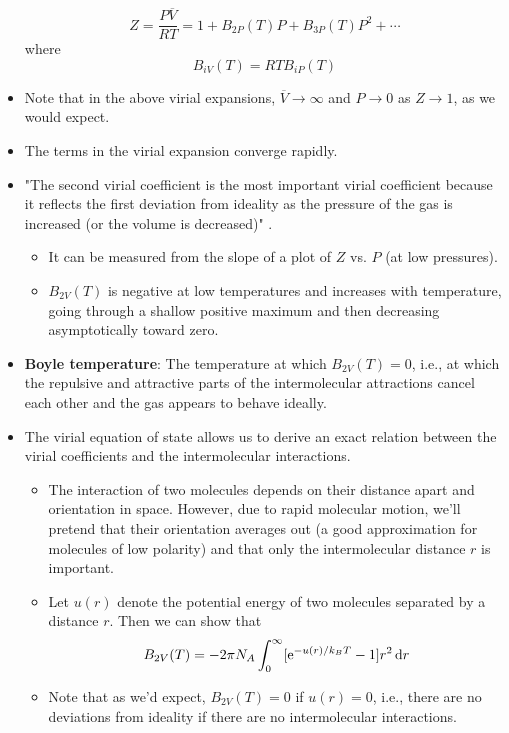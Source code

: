 \documentclass[../notes.tex]{subfiles}
\begin{document}
\begin{itemize}
\begin{equation*}
        Z = \frac{P\overline{V}}{RT}
        = 1+B_{2P}(T)P+B_{3P}(T)P^2+\cdots
    \end{equation*}
    where
    \begin{equation*}
        B_{iV}(T) = RTB_{iP}(T)
    \end{equation*}
    \item Note that in the above virial expansions, $\overline{V}\to\infty$ and $P\to 0$ as $Z\to 1$, as we would expect.
    \item The terms in the virial expansion converge rapidly.
    \item "The second virial coefficient is the most important virial coefficient because it reflects the first deviation from ideality as the pressure of the gas is increased (or the volume is decreased)" \parencite[659]{bib:McQuarrieSimon}.
    \begin{itemize}
        \item It can be measured from the slope of a plot of $Z$ vs. $P$ (at low pressures).
        \item $B_{2V}(T)$ is negative at low temperatures and increases with temperature, going through a shallow positive maximum and then decreasing asymptotically toward zero.
    \end{itemize}
    \item \textbf{Boyle temperature}: The temperature at which $B_{2V}(T)=0$, i.e., at which the repulsive and attractive parts of the intermolecular attractions cancel each other and the gas appears to behave ideally.
    \item The virial equation of state allows us to derive an exact relation between the virial coefficients and the intermolecular interactions.
    \begin{itemize}
        \item The interaction of two molecules depends on their distance apart and orientation in space. However, due to rapid molecular motion, we'll pretend that their orientation averages out (a good approximation for molecules of low polarity) and that only the intermolecular distance $r$ is important.
        \item Let $u(r)$ denote the potential energy of two molecules separated by a distance $r$. Then we can show that
        \begin{equation*}
            B_{2V}(T) = -2\pi N_A\int_0^\infty[\e[-u(r)/k_BT]-1]r^2\dd{r}
        \end{equation*}
        \item Note that as we'd expect, $B_{2V}(T)=0$ if $u(r)=0$, i.e., there are no deviations from ideality if there are no intermolecular interactions.

\end{itemize}
\end{itemize}
\end{document}

